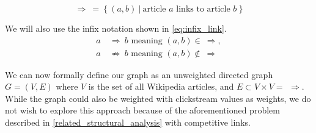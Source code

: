 \begin{equation}
\label{eq:binary_relation}
\Rightarrow\ =\ \{\ (a,b)\ |\ \text{article } a \text{ links to article } b\ \}
\end{equation}

We will also use the infix notation shown in \cref{eq:infix_link}.
\begin{equation}
\label{eq:infix_link}
  \begin{split}
    a\ & \Rightarrow\ b \text{ meaning } (a,b) \in\ \Rightarrow,\\
    a\ & \not\Rightarrow\ b \text{ meaning } (a,b) \not\in\ \Rightarrow
  \end{split}
\end{equation}

We can now formally define our graph as an unweighted directed graph $G = (V,E)$ where $V$ is the set of all Wikipedia articles, and $E\subset V \times V = \ \, \Rightarrow$. While the graph could also be weighted with clickstream values as weights, we do not wish to explore this approach because of the aforementioned problem described in \cref{related_structural_analysis} with competitive links.